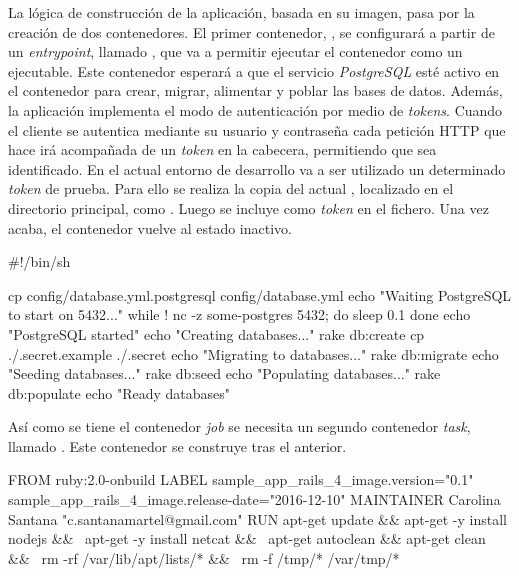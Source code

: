 La lógica de construcción de la aplicación, basada en su imagen, pasa por la creación de dos contenedores. El primer contenedor, , se configurará a partir de un \textit{entrypoint}, llamado , que va a permitir ejecutar el contenedor como un ejecutable. Este contenedor esperará a que el servicio \textit{PostgreSQL} esté activo en el contenedor  para crear, migrar, alimentar y poblar las bases de datos. Además, la aplicación implementa el modo de autenticación por medio de \textit{tokens}. Cuando el cliente se autentica mediante su usuario y contraseña cada petición HTTP que hace irá acompañada de un \textit{token} en la cabecera, permitiendo que sea identificado. En el actual entorno de desarrollo va a ser utilizado un determinado \textit{token} de prueba. Para ello se realiza la copia del actual , localizado en el directorio principal, como . Luego se incluye como \textit{token} en el fichero. Una vez acaba, el contenedor  vuelve al estado inactivo. 

\begin{codelisting}
\label{code:dockerfile}
\begin{code}
#!/bin/sh

cp config/database.yml.postgresql config/database.yml
echo "Waiting PostgreSQL to start on 5432..."
while ! nc -z some-postgres 5432; do
  sleep 0.1
done
echo "PostgreSQL started"
echo "Creating databases..."
rake db:create
cp ./.secret.example ./.secret
echo "Migrating to databases..."
rake db:migrate
echo "Seeding databases..."
rake db:seed
echo "Populating databases..."
rake db:populate
echo "Ready databases"
\end{code}
\end{codelisting}

Así como se tiene el contenedor \textit{job} se necesita un segundo contenedor \textit{task}, llamado . Este contenedor se construye tras el anterior.

\begin{codelisting}
\label{code:dockerfile}
\begin{code}
FROM ruby:2.0-onbuild
LABEL sample_app_rails_4_image.version="0.1" 
      sample_app_rails_4_image.release-date="2016-12-10"
MAINTAINER Carolina Santana "c.santanamartel@gmail.com"
RUN apt-get update && apt-get -y install nodejs && \
    apt-get -y install netcat && \
    apt-get autoclean && apt-get clean && \
    rm -rf /var/lib/apt/lists/* && \
    rm -f /tmp/* /var/tmp/*
\end{code}
\end{codelisting}

